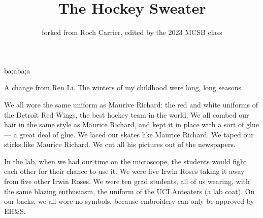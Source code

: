 \documentclass{article}
\title{The Hockey Sweater}
\author{forked from Roch Carrier, edited by the 2023 MCSB class}
\begin{document}
\maketitle
ba;aba;a

A change from Ren Li.
The winters of my childhood were long, long seasons.


We all wore the same uniform as Maurive Richard: 
the red and white uniforms of the Detroit Red Wings, the best hockey team in the world.
We all combed our hair in the same style as Maurice Richard, 
and kept it in place with a sort of glue --- a great deal of glue.
We laced our skates like Maurice Richard.
We taped our sticks like Maurice Richard.
We cut all his pictures out of the newspapers.


In the lab, when we had our time on the microscope, the students would fight each other for their chance to use it.
We were five Irwin Roses taking it away from five other Irwin Roses.
We were ten grad students, all of us wearing, with the same blazing enthusiasm, the uniform of the UCI Anteaters (a lab coat).
On our backs, we all wore no symbols, because embroidery can only be approved by EH&S.
\end{document}
